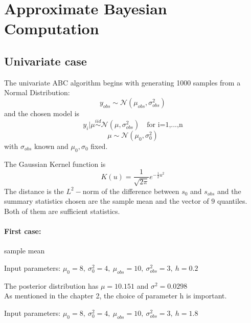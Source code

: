 \documentclass[11pt,a4paper,oneside]{report}
\begin{document}
\section{Approximate Bayesian Computation}

\subsection{Univariate case}
The univariate ABC algorithm begins with generating 1000 samples from a Normal Distribution:
$$
	y_{obs} \sim  \mathcal{N} (\mu_{obs}, \sigma_{obs} ^2)
$$ 
and the chosen model is
$$
	y_{i} | \mu  \overset{iid}\sim \mathcal{N}(\mu, \sigma_{obs} ^2) \quad \text{for i=1,...,n}
$$
$$
	\mu  \sim \mathcal{N}(\mu_{0}, \sigma_{0}^2)
$$
with $ \sigma_{obs}$ known and $\mu_{0}, \sigma_{0} $ fixed.

The Gaussian Kernel function is
$$
	K(u) = \frac{1}{\sqrt{2\pi}} e^{-\frac{1}{2}u^2}
$$
The distance is the $L^2-$norm of the difference between $s_{0}$ and $s_{obs}$ and the summary statistics chosen are the sample mean and the vector of $9$ quantiles. Both of them are sufficient statistics.

\paragraph{First case:} sample mean\\
\begin{center} Input parameters: $\mu_{0}=8,\  \sigma_{0}^2=4,\  \mu_{obs}=10,\  \sigma_{obs}^2 =3,\ h=0.2$   \end{center}

\begin{figure}[h!]
	\centering
	\caption{}
	\label{abch02}
\end{figure}
\begin{figure}[h!]
	\centering
	\caption{}
	\label{abcsample02}
\end{figure}


The posterior distribution has $\mu=10.151$ and $\sigma^2=0.0298$ \\

As mentioned in the chapter 2, the choice of parameter h is important.  \\
\begin{center} Input parameters: $\mu_{0}=8,\  \sigma_{0}^2=4,\  \mu_{obs}=10,\  \sigma_{obs}^2 =3,\ h=1.8$  \end{center}
\end{document}
